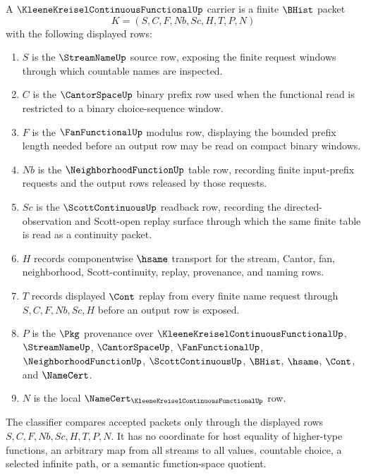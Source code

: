 \begin{definition}
\label{def:kleene-kreisel-continuous-functional-carrier}
A $\KleeneKreiselContinuousFunctionalUp$ carrier is a finite $\BHist$ packet
$$
K=(S,C,F,Nb,Sc,H,T,P,N)
$$
with the following displayed rows:
\begin{enumerate}
\item $S$ is the $\StreamNameUp$ source row, exposing the finite request windows through which countable names are inspected.
\item $C$ is the $\CantorSpaceUp$ binary prefix row used when the functional read is restricted to a binary choice-sequence window.
\item $F$ is the $\FanFunctionalUp$ modulus row, displaying the bounded prefix length needed before an output row may be read on compact binary windows.
\item $Nb$ is the $\NeighborhoodFunctionUp$ table row, recording finite input-prefix requests and the output rows released by those requests.
\item $Sc$ is the $\ScottContinuousUp$ readback row, recording the directed-observation and Scott-open replay surface through which the same finite table is read as a continuity packet.
\item $H$ records componentwise $\hsame$ transport for the stream, Cantor, fan, neighborhood, Scott-continuity, replay, provenance, and naming rows.
\item $T$ records displayed $\Cont$ replay from every finite name request through $S,C,F,Nb,Sc,H$ before an output row is exposed.
\item $P$ is the $\Pkg$ provenance over $\KleeneKreiselContinuousFunctionalUp$, $\StreamNameUp$, $\CantorSpaceUp$, $\FanFunctionalUp$, $\NeighborhoodFunctionUp$, $\ScottContinuousUp$, $\BHist$, $\hsame$, $\Cont$, and $\NameCert$.
\item $N$ is the local $\NameCert_{\KleeneKreiselContinuousFunctionalUp}$ row.
\end{enumerate}
The classifier compares accepted packets only through the displayed rows $S,C,F,Nb,Sc,H,T,P,N$. It has no coordinate for host equality of higher-type functions, an arbitrary map from all streams to all values, countable choice, a selected infinite path, or a semantic function-space quotient.
\end{definition}


